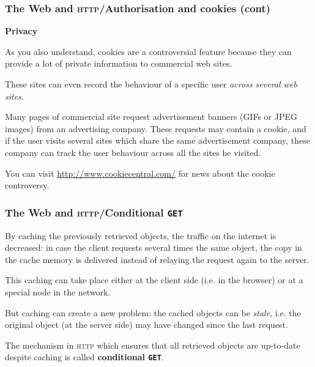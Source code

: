 %
\begin{frame}
\frametitle{The Web and \textsc{http}/Authorisation and cookies (cont)}

\textbf{Privacy}

As you also understand, cookies are a controversial feature because
they can provide a lot of private information to commercial web sites.

\bigskip

These sites can even record the behaviour of a specific user
\emph{across several web sites}. 

\bigskip

Many pages of commercial site request advertisement banners (GIFs or
JPEG images) from an advertising company. These requests may contain a
cookie, and if the user visits several sites which share the same
advertisement company, these company can track the user behaviour
across all the sites he visited.

\bigskip

You can visit \url{http://www.cookiecentral.com/} for news about the
cookie controversy.

\end{frame}

%
\begin{frame}
\frametitle{The Web and \textsc{http}/Conditional \texttt{GET}}

By caching the previously retrieved objects, the traffic on the
internet is decreased: in case the client requests several times the
same object, the copy in the cache memory is delivered instead of
relaying the request again to the server.

\bigskip

This caching can take place either at the client side (i.e. in the
browser) or at a special node in the network.

\bigskip

But caching can create a new problem: the cached objects can be
\emph{stale}, i.e. the original object (at the server side) may have
changed since the last request.

\bigskip

The mechanism in \textsc{http} which ensures that all retrieved
objects are up-to-date despite caching is called \textbf{conditional
  \texttt{GET}}.

\end{frame}

